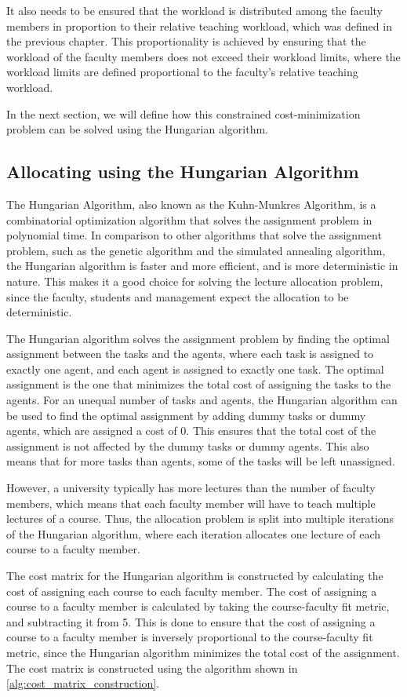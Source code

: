 It also needs to be ensured that the workload is distributed among the faculty members in proportion to their relative teaching workload, which was defined in the previous chapter. This proportionality is achieved by ensuring that the workload of the faculty members does not exceed their workload limits, where the workload limits are defined proportional to the faculty's relative teaching workload.

In the next section, we will define how this constrained cost-minimization problem can be solved using the Hungarian algorithm.

\subsection{Allocating using the Hungarian Algorithm}

The Hungarian Algorithm, also known as the Kuhn-Munkres Algorithm, is a combinatorial optimization algorithm that solves the assignment problem in polynomial time. In comparison to other algorithms that solve the assignment problem, such as the genetic algorithm and the simulated annealing algorithm, the Hungarian algorithm is faster and more efficient, and is more deterministic in nature. This makes it a good choice for solving the lecture allocation problem, since the faculty, students and management expect the allocation to be deterministic.

The Hungarian algorithm solves the assignment problem by finding the optimal assignment between the tasks and the agents, where each task is assigned to exactly one agent, and each agent is assigned to exactly one task. The optimal assignment is the one that minimizes the total cost of assigning the tasks to the agents. For an unequal number of tasks and agents, the Hungarian algorithm can be used to find the optimal assignment by adding dummy tasks or dummy agents, which are assigned a cost of 0. This ensures that the total cost of the assignment is not affected by the dummy tasks or dummy agents. This also means that for more tasks than agents, some of the tasks will be left unassigned.

However, a university typically has more lectures than the number of faculty members, which means that each faculty member will have to teach multiple lectures of a course. Thus, the allocation problem is split into multiple iterations of the Hungarian algorithm, where each iteration allocates one lecture of each course to a faculty member.

The cost matrix for the Hungarian algorithm is constructed by calculating the cost of assigning each course to each faculty member. The cost of assigning a course to a faculty member is calculated by taking the course-faculty fit metric, and subtracting it from 5. This is done to ensure that the cost of assigning a course to a faculty member is inversely proportional to the course-faculty fit metric, since the Hungarian algorithm minimizes the total cost of the assignment. The cost matrix is constructed using the algorithm shown in \autoref{alg:cost_matrix_construction}.

